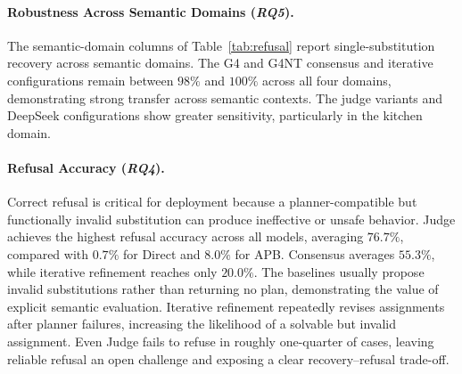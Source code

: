 
\paragraph{Robustness Across Semantic Domains (\textit{RQ5}).}The semantic-domain columns of Table~\ref{tab:refusal} report single-substitution recovery across semantic domains. The G4 and G4NT consensus and iterative configurations remain between $98\%$ and $100\%$ across all four domains, demonstrating strong transfer across semantic contexts. The judge variants and DeepSeek configurations show greater sensitivity, particularly in the kitchen domain. 

\paragraph{Refusal Accuracy (\textit{RQ4}).}Correct refusal is critical for deployment because a planner-compatible but functionally invalid substitution can produce ineffective or unsafe behavior. Judge achieves the highest refusal accuracy across all models, averaging $76.7\%$, compared with $0.7\%$ for Direct and $8.0\%$ for APB. Consensus averages $55.3\%$, while iterative refinement reaches only $20.0\%$. The baselines usually propose invalid substitutions rather than returning no plan, demonstrating the value of explicit semantic evaluation. Iterative refinement repeatedly revises assignments after planner failures, increasing the likelihood of a solvable but invalid assignment. Even Judge fails to refuse in roughly one-quarter of cases, leaving reliable refusal an open challenge and exposing a clear recovery--refusal trade-off.

